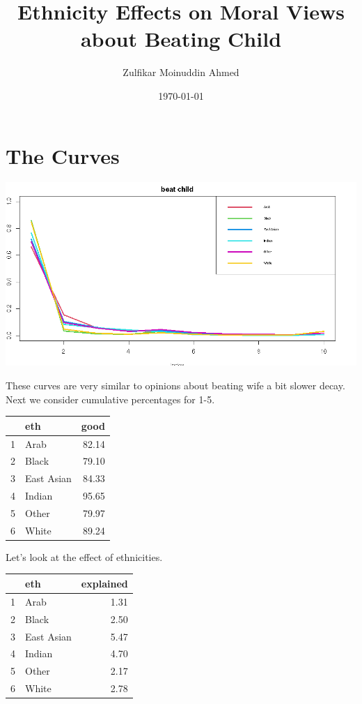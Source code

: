 \documentclass{amsart}
\title{Ethnicity Effects on Moral Views about Beating Child}
\author{Zulfikar Moinuddin Ahmed}
\date{\today}
\begin{document}
\maketitle

\section{The Curves}

\includegraphics[scale=0.5]{ethbeatchild.jpeg}

These curves are very similar to opinions about beating wife a bit slower decay.  Next we consider cumulative percentages for 1-5.

\begin{table}[ht]
\centering
\begin{tabular}{rlr}
  \hline
 & eth & good \\ 
  \hline
1 & Arab & 82.14 \\ 
  2 & Black & 79.10 \\ 
  3 & East Asian & 84.33 \\ 
  4 & Indian & 95.65 \\ 
  5 & Other & 79.97 \\ 
  6 & White & 89.24 \\ 
   \hline
\end{tabular}
\end{table}

Let's look at the effect of ethnicities.

\begin{table}[ht]
\centering
\begin{tabular}{rlr}
  \hline
 & eth & explained \\ 
  \hline
1 & Arab & 1.31 \\ 
  2 & Black & 2.50 \\ 
  3 & East Asian & 5.47 \\ 
  4 & Indian & 4.70 \\ 
  5 & Other & 2.17 \\ 
  6 & White & 2.78 \\ 
   \hline
\end{tabular}
\end{table}
\end{document}
